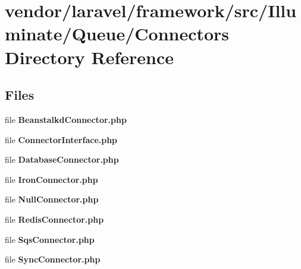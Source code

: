 \section{vendor/laravel/framework/src/\+Illuminate/\+Queue/\+Connectors Directory Reference}
\label{dir_ca9284fa4aa06e3fee78410d8f937f4a}
\subsection*{Files}
\begin{DoxyCompactItemize}
\item 
file {\bf Beanstalkd\+Connector.\+php}
\item 
file {\bf Connector\+Interface.\+php}
\item 
file {\bf Database\+Connector.\+php}
\item 
file {\bf Iron\+Connector.\+php}
\item 
file {\bf Null\+Connector.\+php}
\item 
file {\bf Redis\+Connector.\+php}
\item 
file {\bf Sqs\+Connector.\+php}
\item 
file {\bf Sync\+Connector.\+php}
\end{DoxyCompactItemize}
